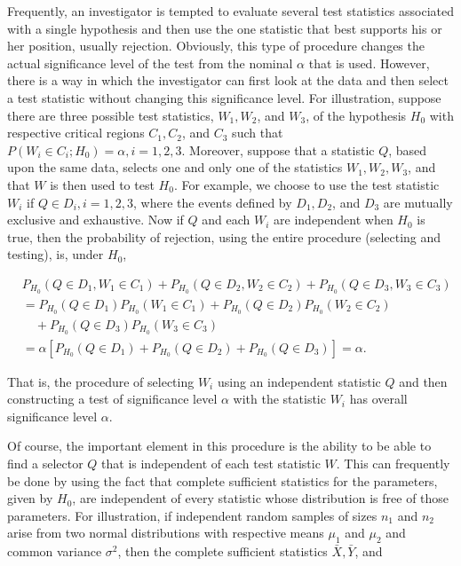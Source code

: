 Frequently, an investigator is tempted to evaluate several test statistics associated with a single hypothesis and then use the one statistic that best supports his or her position, usually rejection. Obviously, this type of procedure changes the actual significance level of the test from the nominal $\alpha$ that is used. However, there is a way in which the investigator can first look at the data and then select a test statistic without changing this significance level. For illustration, suppose there are three possible test statistics, $W_{1}, W_{2}$, and $W_{3}$, of the hypothesis $H_{0}$ with respective critical regions $C_{1}, C_{2}$, and $C_{3}$ such that $P\left(W_{i} \in C_{i} ; H_{0}\right)=\alpha, i=1,2,3$. Moreover, suppose that a statistic $Q$, based upon the same data, selects one and only one of the statistics $W_{1}, W_{2}, W_{3}$, and that $W$ is then used to test $H_{0}$. For example, we choose to use the test statistic $W_{i}$ if $Q \in D_{i}, i=1,2,3$, where the events defined by $D_{1}, D_{2}$, and $D_{3}$ are mutually exclusive and exhaustive. Now if $Q$ and each $W_{i}$ are independent when $H_{0}$ is true, then the probability of rejection, using the entire procedure (selecting and testing), is, under $H_{0}$,

$$
\begin{aligned}
& P_{H_{0}}\left(Q \in D_{1}, W_{1} \in C_{1}\right)+P_{H_{0}}\left(Q \in D_{2}, W_{2} \in C_{2}\right)+P_{H_{0}}\left(Q \in D_{3}, W_{3} \in C_{3}\right) \\
&= P_{H_{0}}\left(Q \in D_{1}\right) P_{H_{0}}\left(W_{1} \in C_{1}\right)+P_{H_{0}}\left(Q \in D_{2}\right) P_{H_{0}}\left(W_{2} \in C_{2}\right) \\
& \quad+P_{H_{0}}\left(Q \in D_{3}\right) P_{H_{0}}\left(W_{3} \in C_{3}\right) \\
&= \alpha\left[P_{H_{0}}\left(Q \in D_{1}\right)+P_{H_{0}}\left(Q \in D_{2}\right)+P_{H_{0}}\left(Q \in D_{3}\right)\right]=\alpha .
\end{aligned}
$$

That is, the procedure of selecting $W_{i}$ using an independent statistic $Q$ and then constructing a test of significance level $\alpha$ with the statistic $W_{i}$ has overall significance level $\alpha$.

Of course, the important element in this procedure is the ability to be able to find a selector $Q$ that is independent of each test statistic $W$. This can frequently be done by using the fact that complete sufficient statistics for the parameters, given by $H_{0}$, are independent of every statistic whose distribution is free of those parameters. For illustration, if independent random samples of sizes $n_{1}$ and $n_{2}$ arise from two normal distributions with respective means $\mu_{1}$ and $\mu_{2}$ and common variance $\sigma^{2}$, then the complete sufficient statistics $\bar{X}, \bar{Y}$, and

